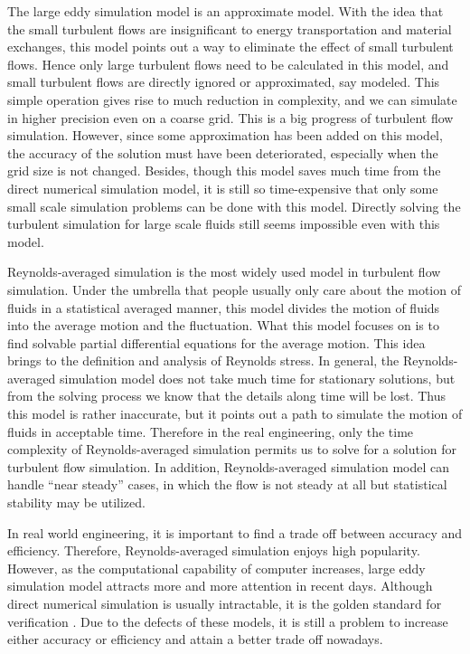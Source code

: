 \documentclass[english, nochinese]{pkupaper}
\begin{document}
The large eddy simulation model is an approximate model. With the idea that the small turbulent flows are insignificant to energy transportation and material exchanges, this model points out a way to eliminate the effect of small turbulent flows. Hence only large turbulent flows need to be calculated in this model, and small turbulent flows are directly ignored or approximated, say modeled. This simple operation gives rise to much reduction in complexity, and we can simulate in higher precision even on a coarse grid. This is a big progress of turbulent flow simulation. However, since some approximation has been added on this model, the accuracy of the solution must have been deteriorated, especially when the grid size is not changed. Besides, though this model saves much time from the direct numerical simulation model, it is still so time-expensive that only some small scale simulation problems can be done with this model. Directly solving the turbulent simulation for large scale fluids still seems impossible even with this model.

Reynolds-averaged simulation is the most widely used model in turbulent flow simulation. Under the umbrella that people usually only care about the motion of fluids in a statistical averaged manner, this model divides the motion of fluids into the average motion and the fluctuation. What this model focuses on is to find solvable partial differential equations for the average motion. This idea brings to the definition and analysis of Reynolds stress. In general, the Reynolds-averaged simulation model does not take much time for stationary solutions, but from the solving process we know that the details along time will be lost. Thus this model is rather inaccurate, but it points out a path to simulate the motion of fluids in acceptable time. Therefore in the real engineering, only the time complexity of Reynolds-averaged simulation permits us to solve for a solution for turbulent flow simulation. In addition, Reynolds-averaged simulation model can handle ``near steady'' cases, in which the flow is not steady at all but statistical stability may be utilized.

In real world engineering, it is important to find a trade off between accuracy and efficiency. Therefore, Reynolds-averaged simulation enjoys high popularity. However, as the computational capability of computer increases, large eddy simulation model attracts more and more attention in recent days. Although direct numerical simulation is usually intractable, it is the golden standard for verification \parencite{zhaoshun_zhang_theory_2005}. Due to the defects of these models, it is still a problem to increase either accuracy or efficiency and attain a better trade off nowadays.
\end{document}
